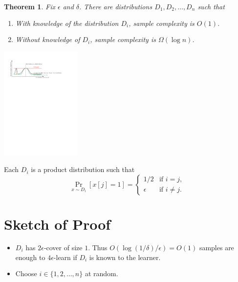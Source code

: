 \documentclass[30pt,landscape]{sciposter}
\newtheorem*{theorem}{Theorem}
\begin{document}
\begin{multicols}{3}
\begin{theorem}
Fix $\epsilon$ and $\delta$. There are distributions $D_1, D_2, \dots, D_n$ such that
\begin{enumerate}
\item With knowledge of the distribution $D_i$, sample complexity is $O(1)$.
\item Without knowledge of $D_i$, sample complexity is $\Omega(\log n)$.
\end{enumerate}
\end{theorem}

\vspace{1cm}

\begin{center}
\includegraphics[width=0.3\textwidth]{figure-2}
\end{center}

\vspace{1cm}


Each $D_i$ is a product distribution such that
$$
\Pr_{x \sim D_i}[x[j] = 1] =
\begin{cases}
1/2 & \text{if $i = j$,} \\
\epsilon & \text{if $i \neq j$.}
\end{cases}
$$

\columnbreak

\section*{Sketch of Proof}

\begin{itemize}
\item $D_i$ has $2\epsilon$-cover of size $1$. Thus $O(\log(1/\delta)/\epsilon) = O(1)$
samples are enough to $4\epsilon$-learn if $D_i$ is known to the learner.

\vspace{1cm}

\item Choose $i \in \{1,2,\dots,n\}$ at random.


\end{itemize}
\end{multicols}
\end{document}
